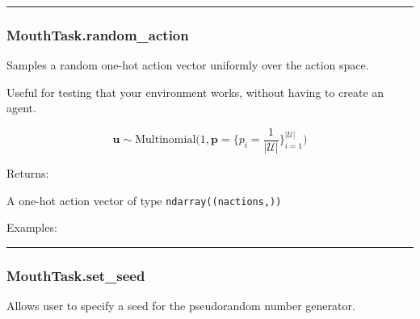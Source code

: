 \begin{center}\rule{0.5\linewidth}{\linethickness}\end{center}

\subsubsection{MouthTask.random\_action}\label{mouthtask.random_action}

\begin{Shaded}
\begin{Highlighting}[]
\NormalTok{)}
\end{Highlighting}
\end{Shaded}

Samples a random one-hot action vector uniformly over the action space.

Useful for testing that your environment works, without having to create
an agent.

\[
\mathbf u \sim \mathrm{Multinomial}\Big(1, \mathbf p=\{p_i = \frac{1}{|\mathcal U|}\}_{i=1}^{|\mathcal U|}\Big)
\]

Returns:

A one-hot action vector of type \texttt{ndarray((nactions,))}

Examples:

\begin{Shaded}
\begin{Highlighting}[]
\OperatorTok{=}
\end{Highlighting}
\end{Shaded}

\begin{center}\rule{0.5\linewidth}{\linethickness}\end{center}

\subsubsection{MouthTask.set\_seed}\label{mouthtask.set_seed}

\begin{Shaded}
\begin{Highlighting}[]
\OperatorTok{=}\NormalTok{)}
\end{Highlighting}
\end{Shaded}

Allows user to specify a seed for the pseudorandom number generator.

